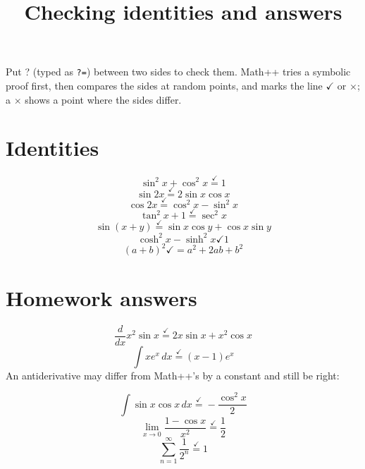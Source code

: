\documentclass[11pt,a4paper]{article}
\title{Checking identities and answers}
\date{}
\providecommand{\xmark}{\ensuremath{\times}}
\theoremstyle{plain}
\theoremstyle{definition}
\theoremstyle{remark}
\begin{document}
\maketitle
Put ? (typed as \texttt{?=}) between two sides to check them. Math++ tries a
symbolic proof first, then compares the sides at random points, and marks the line $\checkmark$ or $\xmark$;
a $\xmark$ shows a point where the sides differ.

\section*{Identities}

\begin{equation*}
  \sin^2 x + \cos^2 x \overset{\checkmark }{=} 1
\end{equation*}
\begin{equation*}
  \sin 2x \overset{\checkmark }{=} 2 \sin x \cos x
\end{equation*}
\begin{equation*}
  \cos 2x \overset{\checkmark }{=} \cos^2 x - \sin^2 x
\end{equation*}
\begin{equation*}
  \tan^2 x + 1 \overset{\checkmark }{=} \sec^2 x
\end{equation*}
\begin{equation*}
  \sin(x + y) \overset{\checkmark }{=} \sin x \cos y + \cos x \sin y
\end{equation*}
\begin{equation*}
  \cosh^2 x - \sinh^2 x \checkmark  1
\end{equation*}
\begin{equation*}
  (a + b)^2 \checkmark = a^2 + 2ab + b^2
\end{equation*}
\section*{Homework answers}

\begin{equation*}
  \frac{d}{dx} x^2 \sin x \overset{\checkmark }{=} 2x \sin x + x^2 \cos x
\end{equation*}
\begin{equation*}
  \int x e^x \, dx \overset{\checkmark }{=} (x - 1) e^x
\end{equation*}
An antiderivative may differ from Math++'s by a constant and still be right:

\begin{equation*}
  \int \sin x \cos x \, dx \overset{\checkmark }{=} -\frac{\cos^2 x}{2}
\end{equation*}
\begin{equation*}
  \lim_{x \to 0} \frac{1 - \cos x}{x^2} \overset{\checkmark }{=} \frac{1}{2}
\end{equation*}
\begin{equation*}
  \sum_{n=1}^{\infty} \frac{1}{2^n} \overset{\checkmark }{=} 1
\end{equation*}
\end{document}
